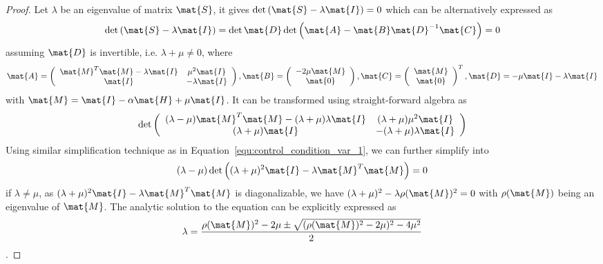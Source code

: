 \begin{lemma}
\begin{proof}
	Let $\lambda$ be an eigenvalue of matrix $\mat{S}$, it gives 
$\det\left(\mat{S} - \lambda \mat{I} \right) = 0$ which can be alternatively expressed as
\begin{equation}	
\det \left( \mat{S} - \lambda \mat{I}\right) = \det{\mat{D}} \det{\left(\mat{A} - \mat{B} \mat{D}^{-1}
\mat{C} \right)} = 0
\label{equ:control_condition_var_1}
\end{equation}
assuming $\mat{D}$ is invertible, i.e. $\lambda + \mu \neq 0$, where \begin{equation*}
		\mat{A} = \left( { \begin{array}{c c}
 			\mat{M}^T\mat{M} - \lambda \mat{I} &  \mu^2 \mat{I} \\
 			\mat{I} & - \lambda \mat{I}
 		\end{array} } \right), 
 		\mat{B} = \left( { \begin{array}{c}
 			-2\mu \mat{M} \\
 			\mat{0}
 		\end{array}}\right),
 		\mat{C} = \left( {\begin{array}{c}
 			\mat{M} \\
 			\mat{0}
 		\end{array}} \right)^T,
 		\mat{D} = -\mu \mat{I} - \lambda \mat{I}
	\end{equation*}
	with $\mat{M}=\mat{I}-\alpha \mat{H} + \mu \mat{I}$. It can be transformed using straight-forward algebra as
	\begin{equation}
		\det \left( \begin{array}{c c}
 			(\lambda - \mu) \mat{M}^T\mat{M} - (\lambda + \mu) \lambda \mat{I} & (\lambda + \mu)\mu^2 \mat{I} \\
 			(\lambda + \mu) \mat{I} & -(\lambda + \mu)\lambda \mat{I}
 		\end{array} \right)
		\label{equ:control_condition_var_2}	
	\end{equation}
	Using similar simplification technique as in Equation~\eqref{equ:control_condition_var_1}, we can further simplify into
	\begin{equation}
		(\lambda - \mu)\det \left( (\lambda + \mu)^2 \mat{I} - \lambda \mat{M}^T\mat{M} \right) = 0
	\end{equation}
	if $\lambda \neq \mu$, as $(\lambda + \mu)^2 \mat{I} - \lambda \mat{M}^T\mat{M}$ is diagonalizable, we have $(\lambda + \mu)^2 - \lambda \rho(\mat{M})^2 = 0$ with $\rho(\mat{M})$ being an eigenvalue of $\mat{M}$. The analytic solution to the equation can be explicitly expressed as
	\begin{equation}
		\lambda = \frac{\rho(\mat{M})^2 - 2\mu \pm \sqrt{(\rho(\mat{M})^2 - 2\mu)^2 - 4\mu^2}}{2}
		\label{equ:control_condition_var_3}	
	\end{equation}.
	

\end{proof}
\end{lemma}
